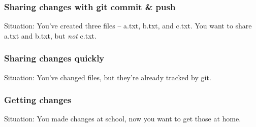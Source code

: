 \documentclass[handout]{beamer}
\begin{document}
\begin{frame}
\frametitle{Sharing changes with git commit \& push}
\alert{Situation:} You've created three files -- a.txt, b.txt, and c.txt. You
want to share a.txt and b.txt, but \emph{not} c.txt.

\vspace{.05\textwidth}


\vspace{.05\textwidth}

\begin{enumerate}
\end{enumerate}
\end{frame}

\begin{frame}
\frametitle{Sharing changes quickly}
\alert{Situation:} You've changed files, but they're already tracked by git.

\vspace{.05\textwidth}


\vspace{.05\textwidth}
\begin{enumerate}
\end{enumerate}
\end{frame}

\begin{frame}
\frametitle{Getting changes}
\alert{Situation:} You made changes at school, now you want to get those at
home.

\vspace{.05\textwidth}


\vspace{.05\textwidth}
\begin{enumerate}
\end{enumerate}
\end{frame}
\end{document}
